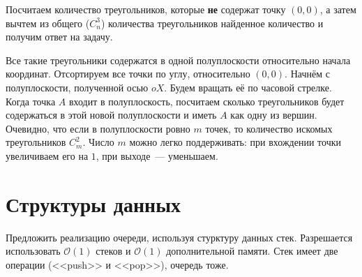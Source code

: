 \documentclass[addpoints]{exam}
\begin{document}
\begin{questions}

\begin{solution}

Посчитаем количество треугольников, которые \textbf{не} содержат точку $(0,0)$, а затем вычтем из общего ($C_n^3$) количества треугольников найденное количество и получим ответ на задачу.

Все такие треугольники содержатся в одной полуплоскости относительно начала координат. Отсортируем все точки по углу, относительно $(0,0)$. Начнём с полуплоскости, полученной осью $oX$. Будем вращать её по часовой стрелке. Когда точка $A$ входит в полуплоскость, посчитаем сколько треугольников будет содержаться в этой новой полуплоскости и иметь $A$ как одну из вершин. Очевидно, что если в полуплоскости ровно $m$ точек, то количество искомых треугольников $C_m^2$. Число $m$ можно легко поддерживать: при вхождении точки увеличиваем его на $1$, при выходе~--- уменьшаем.

\end{solution}


\section{Структуры данных}

\question Предложить реализацию очереди, используя стурктуру данных стек. Разрешается использовать $\mathcal{O}(1)$ стеков и $\mathcal{O}(1)$ дополнительной памяти. Стек имеет две операции (<<push>> и <<pop>>), очередь тоже.

\end{questions}
\end{document}
